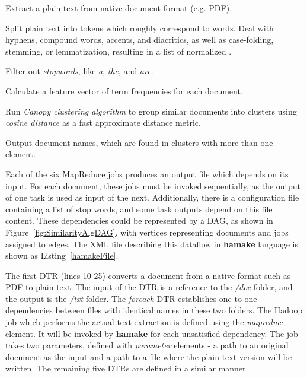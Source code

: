 \documentclass[10pt,conference,letterpaper]{IEEEtran}
\begin{document}
\begin{description}
\item[\emph{ExtractText}] Extract a plain text from native document format
  (e.g. PDF).
\item[\emph{Tokenize}] Split plain text into tokens which roughly
  correspond to words. Deal with hyphens, compound words,
  accents, and diacritics, as well as case-folding, stemming, or lemmatization, resulting in a list of normalized .
\item[\emph{FilterStopwords}] Filter out \textit{stopwords}, 
  like \textit{a}, \textit{the}, and \textit{are}.
\item[\emph{CalculateTF}]  Calculate a feature vector of term frequencies for each document.
\item[\emph{FindSimilar}] Run \textit{Canopy clustering algorithm}
  to group similar documents into clusters using
  \textit{cosine distance} as a fast approximate distance metric. 
\item[\emph{OutputResult}] Output document names, which are found in
  clusters with more than one element.
\end{description}

Each of the six MapReduce jobs produces an output file which
depends on its input. For each document, these jobs must be invoked
sequentially, as the output of one task is used as input of the next. Additionally, there is a configuration file containing a list of
stop words, and some task outputs depend on this file content. These
dependencies could be represented by a DAG, as shown in Figure~\ref{fig:SimilarityAlgDAG}, with vertices representing documents and jobs assigned to edges. The XML file describing this dataflow in \textbf{hamake} language is shown as
Listing~\ref{hamakeFile}.



The first DTR (lines 10-25) converts a document from a native format such
as PDF to plain text. The input of the DTR is a reference to the
\emph{/doc} folder, and the output is the \emph{/txt} folder. The
\emph{foreach} DTR establishes one-to-one dependencies between files
with identical names in these two folders. The Hadoop job which
performs the actual text extraction is defined using the \emph{mapreduce}
element. It will be invoked by \textbf{hamake} for each unsatisfied
dependency. The job takes two parameters, defined with
\emph{parameter} elements - a path to an original document as the input and a path to a file where the plain text version will be written. The remaining five DTRs are defined in a similar manner.
\end{document}
